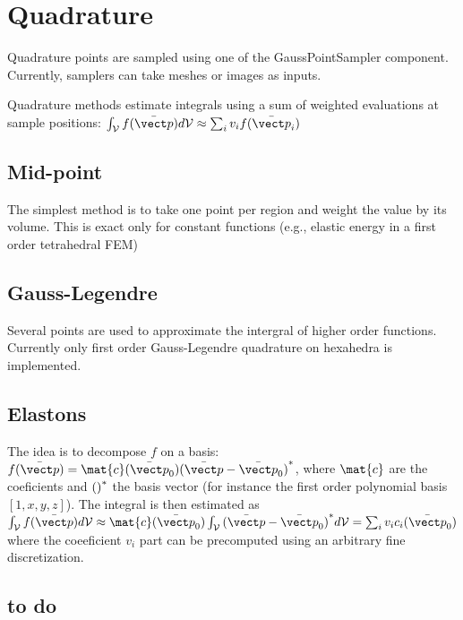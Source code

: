 \newpage
\section{Quadrature} \label{sec quadrature}

Quadrature points are sampled using one of the GaussPointSampler component.
Currently, samplers can take meshes or images as inputs.

Quadrature methods estimate integrals using a sum of weighted evaluations at sample positions: $\int_{\volume} f(\pinit) d\volume \approx \sum_i v_i f(\pinit_i) $

\subsection{Mid-point}

The simplest method is to take one point per region and weight the value by its volume.
This is exact only for constant functions (e.g., elastic energy in a first order tetrahedral FEM)

\subsection{Gauss-Legendre}

Several points are used to approximate the intergral of higher order functions.
Currently only first order Gauss-Legendre quadrature on hexahedra is implemented.

\subsection{Elastons}

The idea is to decompose $f$ on a basis: $f(\pinit)=\mat{c}(\pinit_0) \polynomial{(\pinit-\pinit_0)}{*}$, 
where $\mat{c}$ are the coeficients and ${()}^{*}$ the basis vector (for instance the first order polynomial basis $[1,x,y,z]$).
The integral is then estimated as  $\int_{\volume} f(\pinit) d\volume \approx \mat{c}(\pinit_0)  \int_{\volume} \polynomial{(\pinit-\pinit_0)}{*} d\volume = \sum_i v_i c_i(\pinit_0) $
where the coeeficient $v_i$ part can be precomputed using an arbitrary fine discretization.

\subsection{to do}

